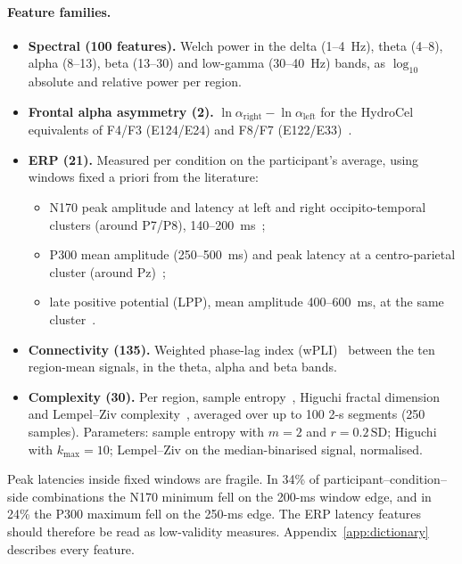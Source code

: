 \paragraph{Feature families.}
\begin{itemize}
  \item \textbf{Spectral (100 features).} Welch power in the delta (1--4~Hz), theta (4--8), alpha (8--13),
        beta (13--30) and low-gamma (30--40~Hz) bands, as $\log_{10}$ absolute and relative power per region.
  \item \textbf{Frontal alpha asymmetry (2).} $\ln\alpha_\text{right}-\ln\alpha_\text{left}$ for the HydroCel
        equivalents of F4/F3 (E124/E24) and F8/F7 (E122/E33)~\cite{allen2015faa,vandervinne2017faa}.
  \item \textbf{ERP (21).} Measured per condition on the participant's average, using windows fixed a priori from
        the literature:
        \begin{itemize}
          \item N170 peak amplitude and latency at left and right occipito-temporal clusters (around P7/P8),
                140--200~ms~\cite{bentin1996n170};
          \item P300 mean amplitude (250--500~ms) and peak latency at a centro-parietal cluster
                (around Pz)~\cite{polich2007p300};
          \item late positive potential (LPP), mean amplitude 400--600~ms, at the same
                cluster~\cite{hajcak2010erp}.
        \end{itemize}
  \item \textbf{Connectivity (135).} Weighted phase-lag index (wPLI)~\cite{vinck2011wpli} between the ten
        region-mean signals, in the theta, alpha and beta bands.
  \item \textbf{Complexity (30).} Per region, sample entropy~\cite{richman2000sampen}, Higuchi fractal
        dimension~\cite{higuchi1988} and Lempel--Ziv complexity~\cite{lempel1976complexity}, averaged over up to 100
        2-s segments (250 samples). Parameters: sample entropy with $m=2$ and $r=0.2\,\mathrm{SD}$; Higuchi with
        $k_\text{max}=10$; Lempel--Ziv on the median-binarised signal, normalised.
\end{itemize}
Peak latencies inside fixed windows are fragile. In 34\% of participant--condition--side combinations the N170
minimum fell on the 200-ms window edge, and in 24\% the P300 maximum fell on the 250-ms edge. The ERP latency
features should therefore be read as low-validity measures. Appendix~\ref{app:dictionary} describes every feature.

